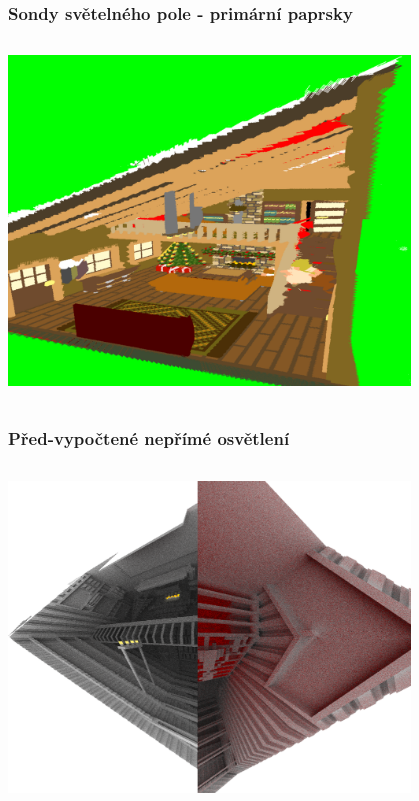 \documentclass[10pt,xcolor=pdflatex,hyperref={unicode},aspectratio=169]{beamer}
\begin{document}
\begin{frame}\frametitle{Sondy světelného pole - primární paprsky}
    \begin{column}{\textwidth}
        \begin{center}
            \includegraphics[width=0.8\textwidth]{img/probe_scene_render.png}
        \end{center}
    \end{column}
\end{frame}

\begin{frame}\frametitle{Před-vypočtené nepřímé osvětlení}
    \begin{column}{\textwidth}
        \begin{center}
            \includegraphics[width=0.8\textwidth]{img/indirect_probe.png}
        \end{center}
    \end{column}
\end{frame}
\end{document}
